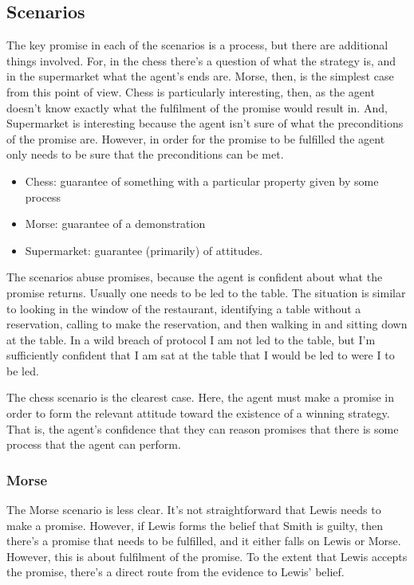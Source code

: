 \documentclass[10pt]{article}
\begin{document}
\subsection{Scenarios}
\label{sec:scenarios-1}

The key promise in each of the scenarios is a process, but there are additional things involved.
For, in the chess there's a question of what the strategy is, and in the supermarket what the agent's ends are.
Morse, then, is the simplest case from this point of view.
Chess is particularly interesting, then, as the agent doesn't know exactly what the fulfilment of the promise would result in.
And, Supermarket is interesting because the agent isn't sure of what the preconditions of the promise are.
However, in order for the promise to be fulfilled the agent only needs to be sure that the preconditions can be met.

\begin{itemize}
\item Chess: guarantee of something with a particular property given by some process
\item Morse: guarantee of a demonstration
\item Supermarket: guarantee (primarily) of attitudes.
\end{itemize}



The scenarios abuse promises, because the agent is confident about what the promise returns.
Usually one needs to be led to the table.
The situation is similar to looking in the window of the restaurant, identifying a table without a reservation, calling to make the reservation, and then walking in and sitting down at the table.
In a wild breach of protocol I am not led to the table, but I'm sufficiently confident that I am sat at the table that I would be led to were I to be led.


The chess scenario is the clearest case.
Here, the agent must make a promise in order to form the relevant attitude toward the existence of a winning strategy.
That is, the agent's confidence that they can reason promises that there is some process that the agent can perform.

\subsubsection{Morse}
\label{sec:morse}



The Morse scenario is less clear.
It's not straightforward that Lewis needs to make a promise.
However, if Lewis forms the belief that Smith is guilty, then there's a promise that needs to be fulfilled, and it either falls on Lewis or Morse.
However, this is about fulfilment of the promise.
To the extent that Lewis accepts the promise, there's a direct route from the evidence to Lewis' belief.
\end{document}
